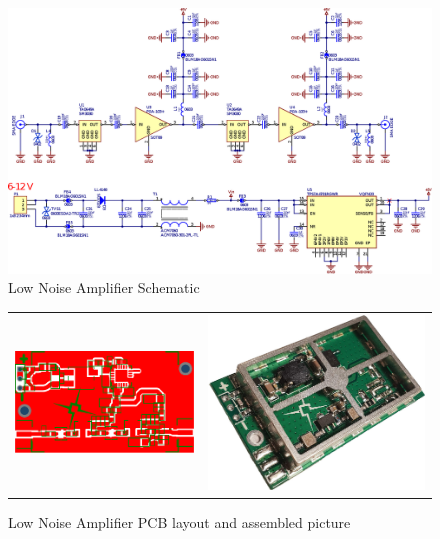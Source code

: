 \begin{figure}[H]
    \centering
    \includegraphics[width=0.8\paperwidth]{img/3/lna_schematic.eps}
    \caption{Low Noise Amplifier Schematic}
    \label{lna_schematic}
\end{figure}

\begin{figure}
   \centering
\begin{tabular}{cc}
        \includegraphics[width=0.4\paperwidth]{img/3/lna_pcb.eps}
    & 
        \includegraphics[width=0.3\paperwidth]{img/3/lna_assembled.jpg}
\end{tabular}
\label{lna_pcb}
\caption{Low Noise Amplifier PCB layout and assembled picture}
\end{figure}




